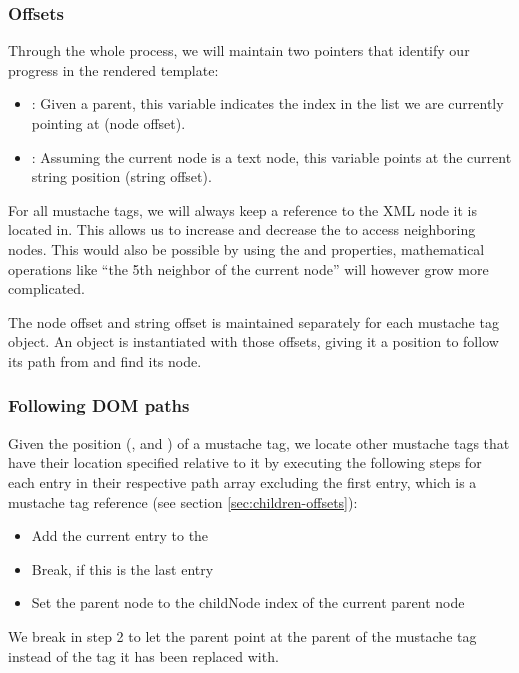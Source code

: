 \subsubsection{Offsets}
Through the whole process, we will maintain two pointers that identify our
progress in the rendered template:
\begin{itemize}
\item {}: Given a parent, this variable indicates the index
      in the  list we are currently pointing at (node offset).
\item {}: Assuming the current node is a text node, this variable
      points at the current string position (string offset).
\end{itemize}

For all mustache tags, we will always keep a reference to the 
XML node it is located in. This allows us to increase and decrease the
 to access neighboring nodes. This would also be possible by
using the  and  properties,
mathematical operations like ``the 5th neighbor of the current node'' will
however grow more complicated.

The node offset and string offset is maintained separately for each mustache tag
object. An object is instantiated with those offsets, giving it a position to
follow its path from and find its node.

\subsubsection{Following DOM paths}
Given the position (,  and )
of a mustache tag, we locate other mustache tags that have their location
specified relative to it by executing the following steps for each entry in
their respective path array
excluding the first entry, which is a mustache tag reference
(see section \ref{sec:children-offsets}):
\begin{itemize}
\item Add the current entry to the 
\item Break, if this is the last entry
\item Set the parent node to the childNode index  of the
      current parent node
\end{itemize}
We break in step 2 to let the parent point at the parent of the mustache tag
instead of the tag it has been replaced with.

